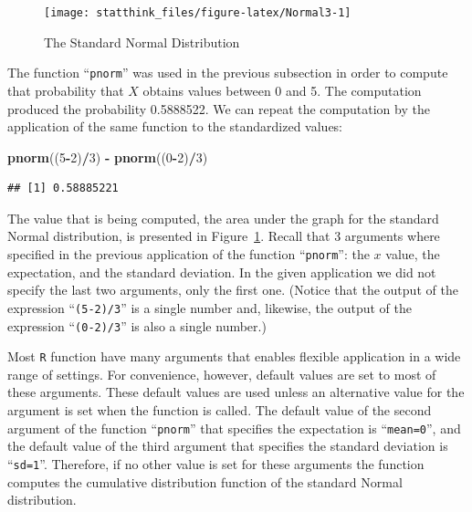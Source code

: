 \documentclass[]{krantz}
\makeatletter
\newenvironment{Shaded}{\begin{snugshade}}{\end{snugshade}}
\newcommand{\KeywordTok}[1]{\textcolor[rgb]{0.13,0.29,0.53}{\textbf{#1}}}
\newcommand{\DecValTok}[1]{\textcolor[rgb]{0.00,0.00,0.81}{#1}}
\newcommand{\StringTok}[1]{\textcolor[rgb]{0.31,0.60,0.02}{#1}}
\newcommand{\OperatorTok}[1]{\textcolor[rgb]{0.81,0.36,0.00}{\textbf{#1}}}
\newcommand{\NormalTok}[1]{#1}
\newenvironment{kframe}{%
\medskip{}
\setlength{\fboxsep}{.8em}
 \def\at@end@of@kframe{}%
 \ifinner\ifhmode%
  \def\at@end@of@kframe{\end{minipage}}%
  \begin{minipage}{\columnwidth}%
 \fi\fi%
 \def\FrameCommand##1{\hskip\@totalleftmargin \hskip-\fboxsep
 \colorbox{shadecolor}{##1}\hskip-\fboxsep
     \hskip-\linewidth \hskip-\@totalleftmargin \hskip\columnwidth}%
 \MakeFramed {\advance\hsize-\width
   \@totalleftmargin\z@ \linewidth\hsize
   \@setminipage}}%
 {\par\unskip\endMakeFramed%
 \at@end@of@kframe}
\renewenvironment{Shaded}{\begin{kframe}}{\end{kframe}}
\theoremstyle{definition}
\theoremstyle{definition}
\theoremstyle{definition}
\theoremstyle{remark}
\makeatother
\begin{document}
\begin{figure}

{\centering \texttt{[image: statthink\_files/figure-latex/Normal3-1]} 

}

\caption{The Standard Normal Distribution}\label{fig:Normal3}
\end{figure}

The function ``\texttt{pnorm}'' was used in the previous subsection in
order to compute that probability that \(X\) obtains values between 0
and 5. The computation produced the probability 0.5888522. We can repeat
the computation by the application of the same function to the
standardized values:

\begin{Shaded}
\begin{Highlighting}[]
\KeywordTok{pnorm}\NormalTok{((}\DecValTok{5}\OperatorTok{-}\DecValTok{2}\NormalTok{)}\OperatorTok{/}\DecValTok{3}\NormalTok{) }\OperatorTok{-}\StringTok{ }\KeywordTok{pnorm}\NormalTok{((}\DecValTok{0}\OperatorTok{-}\DecValTok{2}\NormalTok{)}\OperatorTok{/}\DecValTok{3}\NormalTok{)}
\end{Highlighting}
\end{Shaded}

\begin{verbatim}
## [1] 0.58885221
\end{verbatim}

The value that is being computed, the area under the graph for the
standard Normal distribution, is presented in Figure~\ref{fig:Normal3}.
Recall that 3 arguments where specified in the previous application of
the function ``\texttt{pnorm}'': the \(x\) value, the expectation, and
the standard deviation. In the given application we did not specify the
last two arguments, only the first one. (Notice that the output of the
expression ``\texttt{(5-2)/3}'' is a single number and, likewise, the
output of the expression ``\texttt{(0-2)/3}'' is also a single number.)

Most \texttt{R} function have many arguments that enables flexible
application in a wide range of settings. For convenience, however,
default values are set to most of these arguments. These default values
are used unless an alternative value for the argument is set when the
function is called. The default value of the second argument of the
function ``\texttt{pnorm}'' that specifies the expectation is
``\texttt{mean=0}'', and the default value of the third argument that
specifies the standard deviation is ``\texttt{sd=1}''. Therefore, if no
other value is set for these arguments the function computes the
cumulative distribution function of the standard Normal distribution.
\end{document}
